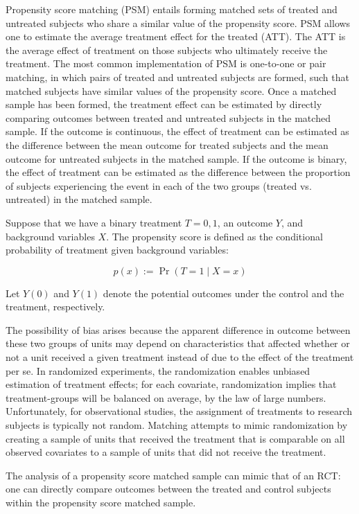 \documentclass{article}
\begin{document}
Propensity score matching (PSM) entails forming matched sets of treated and
untreated subjects who share a similar value of the propensity
score. PSM allows one to estimate the average treatment effect for the
treated (ATT). The ATT is the average effect of treatment on those
subjects who ultimately receive the treatment. The most common
implementation of PSM is one-to-one or pair matching, in which pairs
of treated and untreated subjects are formed, such that matched
subjects have similar values of the propensity score. Once a matched
sample has been formed, the treatment effect can be estimated by
directly comparing outcomes between treated and untreated subjects in
the matched sample. If the outcome is continuous, the effect of
treatment can be estimated as the difference between the mean outcome
for treated subjects and the mean outcome for untreated subjects in
the matched sample. If the outcome is binary, the effect of treatment
can be estimated as the difference between the proportion of subjects
experiencing the event in each of the two groups (treated
vs. untreated) in the matched sample.

Suppose that we have a binary treatment $T={0,1}$, an outcome $Y$, and
background variables $X$. The propensity score is defined as the
conditional probability of treatment given background variables:

$$p(x):= \Pr(T=1 \mid X=x)$$

Let $Y(0)$ and $Y(1)$ denote the potential outcomes under the control
and the treatment, respectively.

The possibility of bias arises because the apparent difference in outcome between these two groups of units may depend on characteristics that affected whether or not a unit received a given treatment instead of due to the effect of the treatment per se. In randomized experiments, the randomization enables unbiased estimation of treatment effects; for each covariate, randomization implies that treatment-groups will be balanced on average, by the law of large numbers. Unfortunately, for observational studies, the assignment of treatments to research subjects is typically not random. Matching attempts to mimic randomization by creating a sample of units that received the treatment that is comparable on all observed covariates to a sample of units that did not receive the treatment.

The analysis of a propensity score matched sample can mimic that of an
RCT: one can directly compare outcomes between the treated and control
subjects within the propensity score matched sample. 
\end{document}
